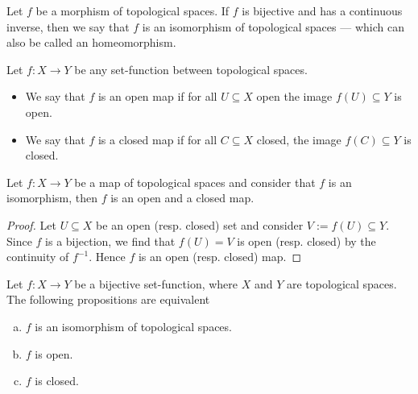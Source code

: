 \begin{definition}[Isomorphism]\label{def: homeomorphism}
Let \(f\) be a morphism of topological spaces. If \(f\) is bijective and has a
continuous inverse, then we say that \(f\) is an isomorphism of topological
spaces --- which can also be called an homeomorphism.
\end{definition}

\begin{definition}\label{def: open/closed maps}
Let \(f : X \to Y\) be any set-function between topological spaces.
\begin{itemize}\setlength\itemsep{0em}
  \item We say that \(f\) is an open map if for all \(U \subseteq X\) open the
    image \(f(U) \subseteq Y\) is open.
  \item We say that \(f\) is a closed map if for all \(C \subseteq X\) closed,
    the image \(f(C) \subseteq Y\) is closed.
\end{itemize}
\end{definition}

\begin{proposition}\label{prop:homeomorphism-is-open-closed}
Let \(f: X \to Y\) be a map of topological spaces and consider that \(f\) is an
isomorphism, then \(f\) is an open and a closed map.
\end{proposition}

\begin{proof}
Let \(U \subseteq X\) be an open (resp. closed) set and consider \(V := f(U)
\subseteq Y\).  Since \(f\) is a bijection, we find that \(f(U) = V\) is open
(resp. closed) by the continuity of \(f^{-1}\). Hence \(f\) is an open (resp.
closed) map.
\end{proof}

\begin{corollary}\label{cor:bij-iso-open-closed}
Let \(f: X \to Y\) be a bijective set-function, where \(X\) and \(Y\) are
topological spaces. The following propositions are equivalent
\begin{enumerate}[(a)]\setlength\itemsep{0em}
\item \(f\) is an isomorphism of topological spaces.
\item \(f\) is open.
\item \(f\) is closed.
\end{enumerate}
\end{corollary}

